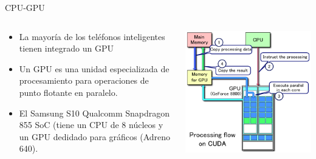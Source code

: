

\begin{frame}{CPU-GPU}
\begin{columns}
\begin{column}{0.50\textwidth}  
\begin{itemize}
\item La mayoría de los teléfonos inteligentes tienen integrado un GPU
\item Un GPU es una unidad especializada de procesamiento para operaciones de punto flotante en paralelo.
\item El Samsung S10 Qualcomm Snapdragon 855 SoC (tiene un CPU de 8 núcleos y un GPU dedidado para gráficos (Adreno 640).
\end{itemize}
\end{column}
\begin{column}{0.50\textwidth}  
    \begin{center}
     \includegraphics[width=\textwidth]{Figs/CUDA_processing_flow}
     \end{center}
\end{column}
\end{columns}
\end{frame}
